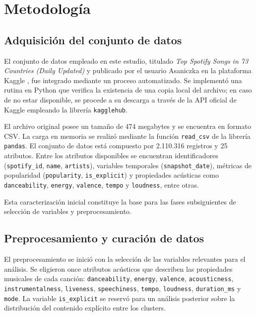 \section{Metodología}

\subsection{Adquisición del conjunto de datos}

El conjunto de datos empleado en este estudio, titulado \textit{Top Spotify Songs in 73 Countries (Daily Updated)} y publicado por el usuario Asaniczka en la plataforma Kaggle \cite{asaniczka2025}, fue integrado mediante un proceso automatizado. Se implementó una rutina en Python que verifica la existencia de una copia local del archivo; en caso de no estar disponible, se procede a su descarga a través de la API oficial de Kaggle empleando la librería \texttt{kagglehub}.

El archivo original posee un tamaño de 474 megabytes y se encuentra en formato CSV. La carga en memoria se realizó mediante la función \texttt{read\_csv} de la librería \texttt{pandas}. El conjunto de datos está compuesto por 2.110.316 registros y 25 atributos. Entre los atributos disponibles se encuentran identificadores (\texttt{spotify\_id}, \texttt{name}, \texttt{artists}), variables temporales (\texttt{snapshot\_date}), métricas de popularidad (\texttt{popularity}, \texttt{is\_explicit}) y propiedades acústicas como \texttt{danceability}, \texttt{energy}, \texttt{valence}, \texttt{tempo} y \texttt{loudness}, entre otras.

Esta caracterización inicial constituye la base para las fases subsiguientes de selección de variables y preprocesamiento.

\subsection{Preprocesamiento y curación de datos}

El preprocesamiento se inició con la selección de las variables relevantes para el análisis. Se eligieron once atributos acústicos que describen las propiedades musicales de cada canción: \texttt{danceability}, \texttt{energy}, \texttt{valence}, \texttt{acousticness}, \texttt{instrumentalness}, \texttt{liveness}, \texttt{speechiness}, \texttt{tempo}, \texttt{loudness}, \texttt{duration\_ms} y \texttt{mode}. La variable \texttt{is\_explicit} se reservó para un análisis posterior sobre la distribución del contenido explícito entre los clusters.

